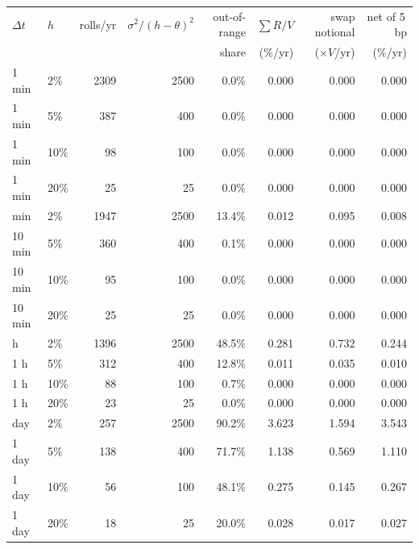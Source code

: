 \begin{tabular}{llrrrrrr}
\toprule
$\Delta t$ & $h$ & rolls/yr & $\sigma^2/(h-\theta)^2$ & out-of-range & $\sum R/V$ & swap notional & net of 5\,bp \\
 & & & & share & (\%/yr) & ($\times V$/yr) & (\%/yr) \\
\midrule
1 min & 2\% & 2309 & 2500 & 0.0\% & 0.000 & 0.000 & 0.000 \\
1 min & 5\% & 387 & 400 & 0.0\% & 0.000 & 0.000 & 0.000 \\
1 min & 10\% & 98 & 100 & 0.0\% & 0.000 & 0.000 & 0.000 \\
1 min & 20\% & 25 & 25 & 0.0\% & 0.000 & 0.000 & 0.000 \\
\addlinespace
10 min & 2\% & 1947 & 2500 & 13.4\% & 0.012 & 0.095 & 0.008 \\
10 min & 5\% & 360 & 400 & 0.1\% & 0.000 & 0.000 & 0.000 \\
10 min & 10\% & 95 & 100 & 0.0\% & 0.000 & 0.000 & 0.000 \\
10 min & 20\% & 25 & 25 & 0.0\% & 0.000 & 0.000 & 0.000 \\
\addlinespace
1 h & 2\% & 1396 & 2500 & 48.5\% & 0.281 & 0.732 & 0.244 \\
1 h & 5\% & 312 & 400 & 12.8\% & 0.011 & 0.035 & 0.010 \\
1 h & 10\% & 88 & 100 & 0.7\% & 0.000 & 0.000 & 0.000 \\
1 h & 20\% & 23 & 25 & 0.0\% & 0.000 & 0.000 & 0.000 \\
\addlinespace
1 day & 2\% & 257 & 2500 & 90.2\% & 3.623 & 1.594 & 3.543 \\
1 day & 5\% & 138 & 400 & 71.7\% & 1.138 & 0.569 & 1.110 \\
1 day & 10\% & 56 & 100 & 48.1\% & 0.275 & 0.145 & 0.267 \\
1 day & 20\% & 18 & 25 & 20.0\% & 0.028 & 0.017 & 0.027 \\
\bottomrule
\end{tabular}
